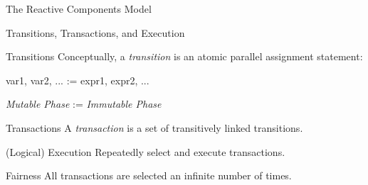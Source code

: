 \documentclass{beamer}
\begin{document}
\begin{frame}{The Reactive Components Model}

\end{frame}

\begin{frame}{Transitions, Transactions, and Execution}

\begin{block}{Transitions}
  Conceptually, a \emph{transition} is an atomic parallel assignment statement:

  \hspace{4em} var1, var2, ... := expr1, expr2, ...

  \hspace{4em} \emph{Mutable Phase} := \emph{Immutable Phase}
\end{block}

\begin{block}{Transactions}
  A \emph{transaction} is a set of transitively linked transitions.
\end{block}

\begin{block}{(Logical) Execution}
  Repeatedly select and execute transactions.
\end{block}

\begin{block}{Fairness}
  All transactions are selected an infinite number of times.
\end{block}
\end{frame}
\end{document}
